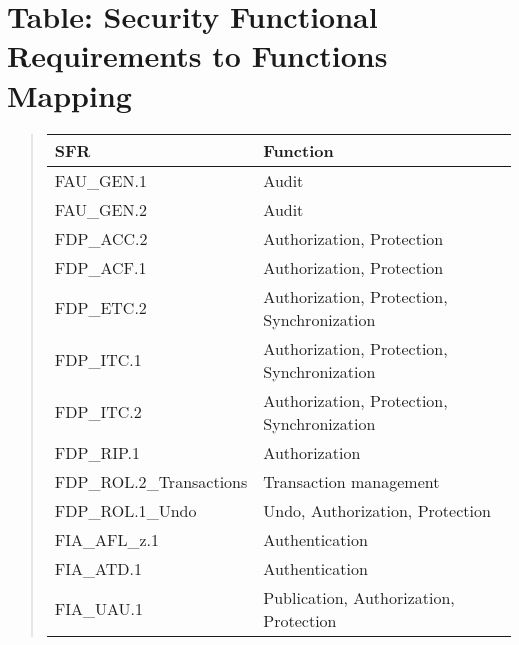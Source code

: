 \documentclass[10pt,a4paper,english]{scrbook}
\begin{document}

\hypertarget{table-security-functional-requirements-to-functions-mapping}{}
\section{Table: Security Functional Requirements to Functions Mapping}
\begin{quote}

\begin{longtable}[c]{|l|l|}
\hline
\textbf{
SFR
} & \textbf{
Function
} \\
\hline
\endhead

FAU{\_}GEN.1
 & 
Audit
 \\
\hline

FAU{\_}GEN.2
 & 
Audit
 \\
\hline

FDP{\_}ACC.2
 & 
Authorization, Protection
 \\
\hline

FDP{\_}ACF.1
 & 
Authorization, Protection
 \\
\hline

FDP{\_}ETC.2
 & 
Authorization, Protection, Synchronization
 \\
\hline

FDP{\_}ITC.1
 & 
Authorization, Protection, Synchronization
 \\
\hline

FDP{\_}ITC.2
 & 
Authorization, Protection, Synchronization
 \\
\hline

FDP{\_}RIP.1
 & 
Authorization
 \\
\hline

FDP{\_}ROL.2{\_}Transactions
 & 
Transaction management
 \\
\hline

FDP{\_}ROL.1{\_}Undo
 & 
Undo, Authorization, Protection
 \\
\hline

FIA{\_}AFL{\_}z.1
 & 
Authentication
 \\
\hline

FIA{\_}ATD.1
 & 
Authentication
 \\
\hline

FIA{\_}UAU.1
 & 
Publication, Authorization, Protection
 \\
\hline


\end{longtable}
\end{quote}
\end{document}
